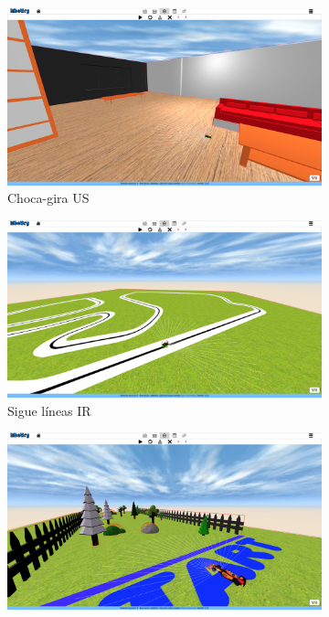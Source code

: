 \begin{figure}[H]
\begin{subfigure}{.5\textwidth}
  \centering
  \includegraphics[width=.95\linewidth]{chapters/images/chocagira.png}  
  \caption{Choca-gira US}
  \label{fig:sub-first}
\end{subfigure}
\begin{subfigure}{.5\textwidth}
  \centering
  \includegraphics[width=.95\linewidth]{chapters/images/siguelineasir.png}  
  \caption{Sigue líneas IR}
  \label{fig:sub-second}
\end{subfigure}
\begin{subfigure}{.5\textwidth}
  \centering
  \includegraphics[width=.95\linewidth]{chapters/images/atraviesabosque.png}  

\end{subfigure}
\end{figure}
